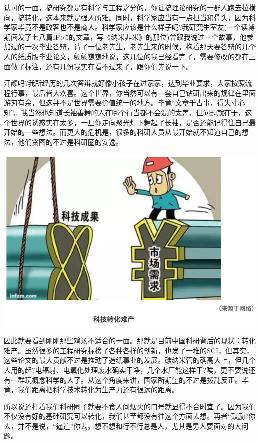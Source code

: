 \documentclass[]{book}
\begin{document}
认可的一面，搞研究都是有科学与工程之分的，你让搞理论研究的一群人跑去拉横向，搞转化，这本来就是强人所难。同时，科学家应当有一点担当和骨头，因为科学家毕竟不是政客也不是商人。科学家应该是什么样子呢?我研究生室友(一个读博期间发了七八篇IF\textgreater{}5的文章，写《纳米非米》的那位)曾跟我说过一个故事，他参加过的一次毕业答辩，请了一位老先生，老先生来的时候，抱着那天要答辩的几个人的纸质版毕业论文，颤颤巍巍地说，这几位的我已经看完了，需要修改的都在上面做了标注，还有几份我实在看不过来了，跟你们先说一下。

汗颜吗?我所经历的几次答辩就好像小孩子在过家家，达到毕业要求，大家按照流程行事，最后皆大欢喜。这个世界，你当然可以有一套自己钻研出来的规律在里面游刃有余，但这并不是世界需要价值统一的地方。毕竟``文章千古事，得失寸心知''。我当然也知道长袖善舞的人在哪个行当都不会混的太差，但问题就在于，这个世界的诱惑实在太多，一旦你走向聚光灯下舞起了长袖，是否还能记得住自己最开始的一些想法。而更大的危机是，很多的科研人员从最开始就不知道自己的想法，他们贪图的不过是科研圈的安逸。

\includegraphics[width=8.33in]{images/kq2}

因此就要看到刚刚那些鸡汤不适合的一面。那就是目前中国科研背后的现状：转化难产。虽然很多的工程研究标榜了各种各样的创新，也发了一堆的SCI，但其实，这些论文的最大贡献不过是推动了造纸事业的发展。碳纳米管的确高大上，但几个人用的起?电辐射、电氧化处理废水确实干净，几个水厂能这样干?唉，更不要说还有一群玩概念科学的人了。从这个角度来讲，国家所期望的不过是拨乱反正。毕竟，我们距离把科学技术转化为生产力还有很远的距离。

所以说还打着我们科研圈子就要不食人间烟火的口号就显得不合时宜了。因为我们不仅没有好的基础研究可以转化，我们甚至都没有往这个方面去想。再者``鼓励''你去，并不是说，``逼迫''你去。想不想和行不行总是人，尤其是男人要面对的大问题。
\end{document}
